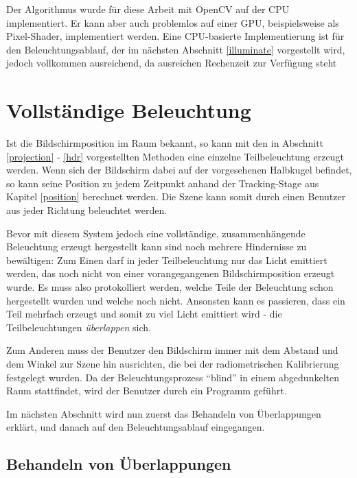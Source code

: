    

   Der Algorithmus wurde für diese Arbeit mit OpenCV auf der CPU implementiert. 
   Er kann aber auch problemlos auf einer GPU, beispielsweise als Pixel-Shader, implementiert werden.
   Eine CPU-basierte Implementierung ist für den Beleuchtungsablauf, der im nächsten Abschnitt \ref{illuminate} vorgestellt wird, jedoch vollkommen ausreichend, da ausreichen Rechenzeit zur Verfügung steht 
  


 \section{Vollständige Beleuchtung} \label{complete}
   
   Ist die Bildschirmposition im Raum bekannt, so kann mit den in Abschnitt \ref{projection} - \ref{hdr} vorgestellten Methoden eine einzelne Teilbeleuchtung erzeugt werden. 
   Wenn sich der Bildschirm dabei auf der vorgesehenen Halbkugel befindet, so kann seine Position zu jedem Zeitpunkt anhand der  Tracking-Stage aus Kapitel \ref{position} berechnet werden.
   Die Szene kann somit durch einen Benutzer aus jeder Richtung beleuchtet werden.
  
   Bevor mit diesem System jedoch eine vollständige, zusammenhängende Beleuchtung erzeugt hergestellt kann sind noch mehrere Hindernisse zu bewältigen:  
   Zum Einen darf in jeder Teilbeleuchtung nur das Licht emittiert werden, das noch nicht von einer vorangegangenen Bildschirmposition erzeugt wurde. 
   Es muss also protokolliert werden, welche Teile der Beleuchtung schon hergestellt wurden und welche noch nicht. 
   Ansonsten kann es passieren, dass ein Teil mehrfach erzeugt und somit zu viel Licht emittiert wird - die Teilbeleuchtungen \emph{überlappen} sich.

   Zum Anderen muss der Benutzer den Bildschirm immer mit dem Abstand und dem Winkel zur Szene hin ausrichten, die bei der radiometrischen Kalibrierung festgelegt wurden.
    Da der Beleuchtungsprozess ``blind'' in einem abgedunkelten Raum stattfindet, wird der Benutzer durch ein Programm geführt.
      
   Im nächsten Abschnitt wird nun zuerst das Behandeln von Überlappungen erklärt, und danach auf den Beleuchtungsablauf eingegangen.
  
  \subsection{Behandeln von Überlappungen} \label{overlap}
   
